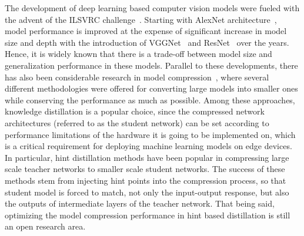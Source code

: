 \documentclass[final,3p,times]{elsarticle}
\begin{document}
The development of deep learning based computer vision models were fueled with the advent of the ILSVRC challenge~\citep{ILSVRC15}. Starting with AlexNet architecture~\citep{alexnet}, model performance is improved at the expense of significant increase in model size and depth with the introduction of VGGNet~\citep{VGG} and ResNet~\citep{resnet} over the years. Hence, it is widely known that there is a trade-off between model size and generalization performance in these models. Parallel to these developments, there has also been considerable research in model compression~\citep{choudhary2020comprehensive}, 
where several different methodologies were offered for converting large models into smaller ones while conserving the performance as much as possible. Among these approaches, knowledge distillation \citep{hinton2015distilling} is a popular choice, since the compressed network architectures (referred to as the student network) can be set according to performance limitations of the hardware it is going to be implemented on, which is a critical requirement for deploying machine learning models on edge devices. In particular, hint distillation methods \citep{romero2015fitnets, Zagoruyko2017AT, huang2022feature, li2022distilling} have been popular in compressing large scale teacher networks to smaller scale student networks. The success of these methods stem from injecting hint points into the compression process, so that student model is forced to match, not only the input-output response, but also the outputs of intermediate layers of the teacher network. That being said, optimizing the model compression performance in hint based distillation is still an open research area. 
\end{document}
